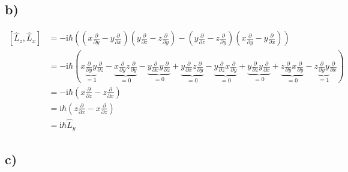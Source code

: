     \subsection{b)} 

    \begin{align*}
        \left[ \hat{L}_z,\hat{L}_x \right] &= -\text{i}\hbar \left(\left( x\frac{\partial}{\partial y} - y\frac{\partial}{\partial x} \right) \left( y\frac{\partial}{\partial z} - z\frac{\partial}{\partial y} \right) - \left( y\frac{\partial}{\partial z} - z\frac{\partial}{\partial y} \right) \left( x\frac{\partial}{\partial y} - y\frac{\partial}{\partial x} \right)\right)\\
        &= -\text{i}\hbar \left( x \underbrace{\frac{\partial}{\partial y}y}_{=1} \frac{\partial}{\partial z} - \underbrace{x\frac{\partial}{\partial y} z\frac{\partial}{\partial y}}_{=0} - \underbrace{y\frac{\partial}{\partial x} y\frac{\partial}{\partial z}}_{=0} + \underbrace{y\frac{\partial}{\partial x} z\frac{\partial}{\partial y}}_{=0} 
        - \underbrace{y\frac{\partial}{\partial z} x\frac{\partial}{\partial y}}_{=0} + \underbrace{y\frac{\partial}{\partial z} y\frac{\partial}{\partial x}}_{=0} + \underbrace{z\frac{\partial}{\partial y} x\frac{\partial}{\partial y}}_{=0} - z \underbrace{\frac{\partial}{\partial y}y}_{=1} \frac{\partial}{\partial x}\right)\\
        &= -\text{i} \hbar\left(x\frac{\partial}{\partial z}-z\frac{\partial}{\partial x}\right)\\
        &= \text{i} \hbar \left(z\frac{\partial}{\partial x}-x\frac{\partial}{\partial z}\right)\\
        &= \text{i}\hbar \hat{L}_y
    \end{align*}

    \subsection{c)}

